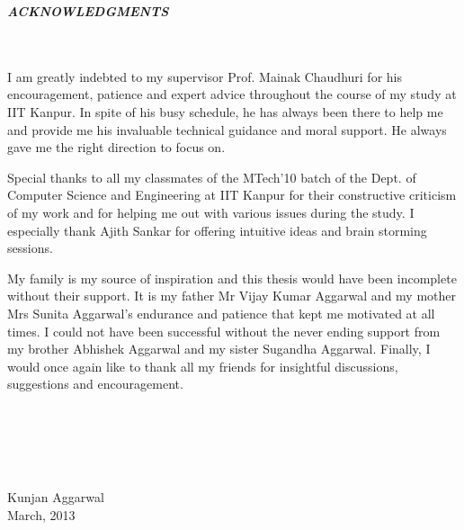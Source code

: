
\begin{center}
\begin{large}
{\it{\bf ACKNOWLEDGMENTS} }
\end{large}
\end{center} 
\ \\ \ \\
I am greatly indebted to my supervisor Prof. Mainak Chaudhuri for his encouragement, patience and expert advice throughout the course of my study at IIT Kanpur. In spite of his busy schedule, he has always been there to help me and provide me his invaluable technical guidance and moral support. He always gave me the right direction to focus on. 

Special thanks to all my classmates of the MTech'10 batch of the Dept. of Computer Science and Engineering at IIT Kanpur for their constructive criticism of my work and for helping me out with various issues during the study. 
I especially thank Ajith Sankar for offering intuitive ideas and brain storming sessions.

My family is my source of inspiration and this thesis would have been incomplete without their support. It is my father Mr Vijay Kumar Aggarwal and my mother Mrs Sunita Aggarwal's endurance and patience that kept me motivated at all times. I could not have been successful without the never ending support from my brother Abhishek Aggarwal and my sister Sugandha Aggarwal. Finally, I would once again like to thank all my friends for insightful discussions, suggestions and encouragement. 

\ \\ \ \\
\ \\ \ \\
\vskip 0.5in
\begin{flushright}
Kunjan Aggarwal\\
March, 2013
\end{flushright}
